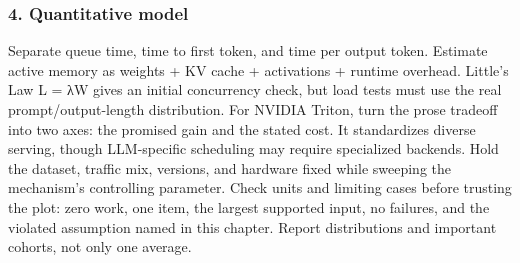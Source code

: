 \subsubsection*{4. Quantitative model}
Separate queue time, time to first token, and time per output token. Estimate active memory as weights + KV cache + activations + runtime overhead. Little's Law L = λW gives an initial concurrency check, but load tests must use the real prompt/output-length distribution.
For NVIDIA Triton, turn the prose tradeoff into two axes: the promised gain and the stated cost. It standardizes diverse serving, though LLM-specific scheduling may require specialized backends. Hold the dataset, traffic mix, versions, and hardware fixed while sweeping the mechanism's controlling parameter.
Check units and limiting cases before trusting the plot: zero work, one item, the largest supported input, no failures, and the violated assumption named in this chapter. Report distributions and important cohorts, not only one average.
